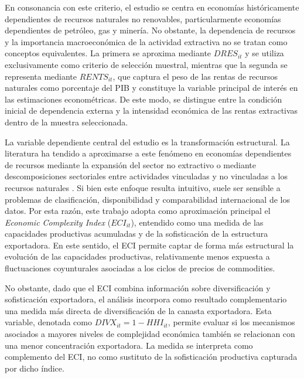 \documentclass[../../PTFM.tex]{subfiles}
\begin{document}
En consonancia con este criterio, el estudio se centra en economías
históricamente dependientes de recursos naturales no renovables,
particularmente economías dependientes de petróleo, gas y minería. No obstante, la
dependencia de recursos y la importancia macroeconómica de la actividad
extractiva no se tratan como conceptos equivalentes. La primera se
aproxima mediante $DRES_{it}$ y se utiliza exclusivamente como criterio
de selección muestral, mientras que la segunda se representa mediante
$RENTS_{it}$, que captura el peso de las rentas de recursos naturales
como porcentaje del PIB y constituye la variable principal de interés en
las estimaciones econométricas. De este modo, se distingue entre la
condición inicial de dependencia externa y la intensidad económica de las
rentas extractivas dentro de la muestra seleccionada.

La variable dependiente central del estudio es la transformación
estructural. La literatura ha tendido a aproximarse a este fenómeno en
economías dependientes de recursos mediante la expansión del sector no
extractivo o mediante descomposiciones sectoriales entre actividades
vinculadas y no vinculadas a los recursos naturales
\parencite{Lashitew2021}. Si bien este enfoque resulta intuitivo, suele
ser sensible a problemas de clasificación, disponibilidad y
comparabilidad internacional de los datos. Por esta razón, este trabajo
adopta como aproximación principal el \textit{Economic Complexity Index}
($ECI_{it}$), entendido como una medida de las capacidades productivas
acumuladas y de la sofisticación de la estructura exportadora. En este
sentido, el ECI permite captar de forma más estructural la evolución de
las capacidades productivas, relativamente menos expuesta a fluctuaciones
coyunturales asociadas a los ciclos de precios de commodities.

No obstante, dado que el ECI combina información sobre diversificación y
sofisticación exportadora, el análisis incorpora como resultado
complementario una medida más directa de diversificación de la canasta
exportadora. Esta variable, denotada como $DIVX_{it}=1-HHI_{it}$, permite
evaluar si los mecanismos asociados a mayores niveles de complejidad
económica también se relacionan con una menor concentración exportadora.
La medida se interpreta como complemento del ECI, no como sustituto de la
sofisticación productiva capturada por dicho índice.
\end{document}
